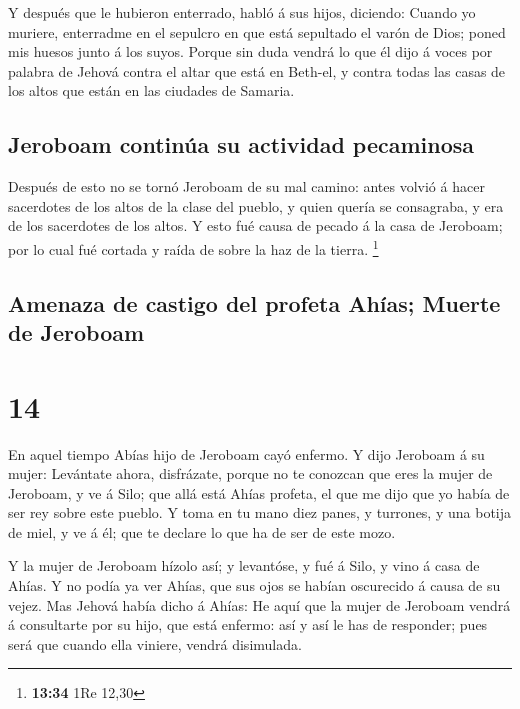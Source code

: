  Y después que le hubieron enterrado, habló á sus hijos,
diciendo: Cuando yo muriere, enterradme en el sepulcro en que está
sepultado el varón de Dios; poned mis huesos junto á los suyos.
 Porque sin duda vendrá lo que él dijo á voces por palabra
de Jehová contra el altar que está en Beth-el, y contra todas las casas
de los altos que están en las ciudades de Samaria.

\hypertarget{jeroboam-continuxfaa-su-actividad-pecaminosa}{%
\subsection{Jeroboam continúa su actividad
pecaminosa}\label{jeroboam-continuxfaa-su-actividad-pecaminosa}}

 Después de esto no se tornó Jeroboam de su mal camino:
antes volvió á hacer sacerdotes de los altos de la clase del pueblo, y
quien quería se consagraba, y era de los sacerdotes de los altos.
 Y esto fué causa de pecado á la casa de Jeroboam; por lo
cual fué cortada y raída de sobre la haz de la tierra. \footnote{\textbf{13:34}
  1Re 12,30}

\hypertarget{amenaza-de-castigo-del-profeta-ahuxedas-muerte-de-jeroboam}{%
\subsection{Amenaza de castigo del profeta Ahías; Muerte de
Jeroboam}\label{amenaza-de-castigo-del-profeta-ahuxedas-muerte-de-jeroboam}}

\hypertarget{section-13}{%
\section{14}\label{section-13}}

 En aquel tiempo Abías hijo de Jeroboam cayó enfermo.
 Y dijo Jeroboam á su mujer: Levántate ahora, disfrázate,
porque no te conozcan que eres la mujer de Jeroboam, y ve á Silo; que
allá está Ahías profeta, el que me dijo que yo había de ser rey sobre
este pueblo.  Y toma en tu mano diez panes, y turrones, y
una botija de miel, y ve á él; que te declare lo que ha de ser de este
mozo.

 Y la mujer de Jeroboam hízolo así; y levantóse, y fué á
Silo, y vino á casa de Ahías. Y no podía ya ver Ahías, que sus ojos se
habían oscurecido á causa de su vejez.  Mas Jehová había
dicho á Ahías: He aquí que la mujer de Jeroboam vendrá á consultarte por
su hijo, que está enfermo: así y así le has de responder; pues será que
cuando ella viniere, vendrá disimulada.

